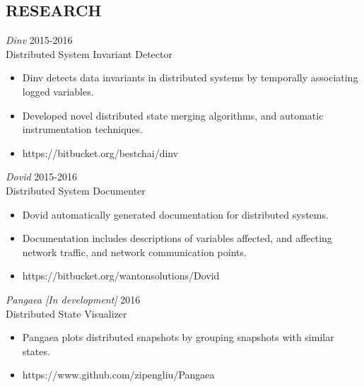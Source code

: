 \documentclass[line,margin]{res}
\begin{document}
\address{3549 Puget Drive, Vancouver, BC }
\address{(604) 970-2469}
\address{sgrant09@cs.ubc.ca}
\begin{resume}
\section{RESEARCH}
{\sl Dinv} \hfill 2015-2016\\
    Distributed System Invariant Detector
\begin{itemize} \itemsep -2pt
        \item Dinv detects data invariants in distributed systems by temporally associating logged variables.
        \item Developed novel distributed state merging algorithms, and automatic instrumentation techniques.
        \item https://bitbucket.org/bestchai/dinv
\end{itemize}

{\sl Dovid} \hfill 2015-2016\\
    Distributed System Documenter
\begin{itemize} \itemsep -2pt
        \item Dovid automatically generated documentation for distributed systems.
        \item Documentation includes descriptions of variables affected, and affecting network traffic, and network communication points.
        \item https://bitbucket.org/wantonsolutions/Dovid
\end{itemize}

{\sl Pangaea [In development]} \hfill 2016\\
    Distributed State Visualizer
\begin{itemize} \itemsep -2pt
        \item Pangaea plots distributed snapshots by grouping snapshots with similar states.
        \item https://www.github.com/zipengliu/Pangaea
\end{itemize}


\end{resume}
\end{document}
